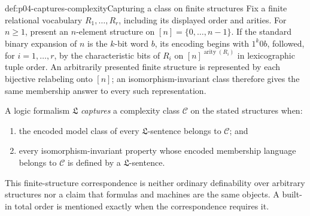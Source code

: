\begin{hbdefinition}{def:p04-captures-complexity}{Capturing a class on finite structures}
Fix a finite relational vocabulary \(R_1,\ldots,R_r\), including its displayed
order and arities.  For \(n\geq1\), present an \(n\)-element structure on
\([n]=\{0,\ldots,n-1\}\).  If the standard binary expansion of \(n\) is the
\(k\)-bit word \(b\), its encoding begins with \(1^k0b\), followed, for
\(i=1,\ldots,r\), by the characteristic bits of \(R_i\) on
\([n]^{\operatorname{arity}(R_i)}\) in lexicographic tuple order.  An
arbitrarily presented finite structure is represented by each bijective
relabeling onto \([n]\); an isomorphism-invariant class therefore gives the
same membership answer to every such representation.

A logic formalism \(\mathfrak L\) \emph{captures} a complexity class
\(\mathcal C\) on the stated structures when:
\begin{enumerate}
 \item the encoded model class of every \(\mathfrak L\)-sentence belongs to
       \(\mathcal C\); and
 \item every isomorphism-invariant property whose encoded membership language
       belongs to \(\mathcal C\) is defined by a \(\mathfrak L\)-sentence.
\end{enumerate}
This finite-structure correspondence is neither ordinary definability over
arbitrary structures nor a claim that formulas and machines are the same
objects.  A built-in total order is mentioned exactly when the correspondence
requires it.
\end{hbdefinition}

